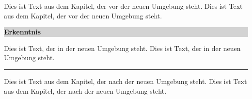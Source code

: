 \documentclass[12pt,a4paper]{scrbook}
\newenvironment{Zusammenfassung}{%
	\vspace{0.5cm}%
	\par\noindent%
	\colorbox{lightgray}{%
		\parbox[l][0.5cm][c]{\textwidth}{%
			\textbf{Erkenntnis}}}%
	\vspace{0.5cm}%
}%
{{\newline\color{lightgray}\rule{\textwidth}{1pt}}\vskip15pt}
\begin{document}
Dies ist Text aus dem Kapitel, der vor der neuen Umgebung steht. 
Dies ist Text aus dem Kapitel, der vor der neuen Umgebung steht.
\begin{Zusammenfassung}
	Dies ist Text, der in der neuen Umgebung steht. 
	Dies ist Text, der in der neuen Umgebung steht. 
\end{Zusammenfassung}
Dies ist Text aus dem Kapitel, der nach der neuen Umgebung steht. 
Dies ist Text aus dem Kapitel, der nach der neuen Umgebung steht. 
\end{document}
